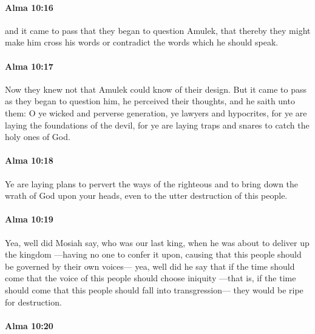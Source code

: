 		\paragraph{Alma 10:16} %
			\label{ALMA-10-16}

			and it came to pass that they began to question Amulek,
			that thereby they might make him cross his words
			or contradict the words which he should speak.

		\paragraph{Alma 10:17} %
			\label{ALMA-10-17}

			Now they knew not that Amulek could know of their design.
			But it came to pass as they began to question him,
			he perceived their thoughts,
			and he saith unto them:
			O ye wicked and perverse generation,
			ye lawyers and hypocrites,
			for ye are laying the foundations of the devil,
			for ye are laying traps and snares to catch the holy ones of God.

		\paragraph{Alma 10:18} %
			\label{ALMA-10-18}

			Ye are laying plans to pervert the ways of the righteous
			and to bring down the wrath of God upon your heads,
			even to the utter destruction of this people.

		\paragraph{Alma 10:19} %
			\label{ALMA-10-19}

			Yea, well did Mosiah say, who was our last king,
			when he was about to deliver up the kingdom
			---having no one to confer it upon,
			causing that this people should be governed by their own voices---
			yea, well did he say that
			if the time should come that the voice of this people should choose iniquity
			---that is, if the time should come that this people should fall into transgression---
			they would be ripe for destruction.

		\paragraph{Alma 10:20} %
			\label{ALMA-10-20}

